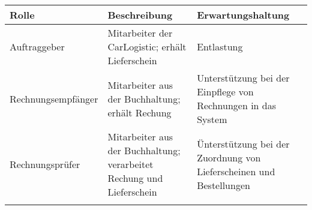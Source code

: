 \begin{table}[bh]
\centering
\caption{Stakeholder}
\label{tab:Stakeholder}
\begin{longtable}[]{@{}lll@{}}
\toprule
\begin{minipage}[b]{0.19\columnwidth}\raggedright\strut
Rolle\strut
\end{minipage} & \begin{minipage}[b]{0.27\columnwidth}\raggedright\strut
Beschreibung\strut
\end{minipage} & \begin{minipage}[b]{0.46\columnwidth}\raggedright\strut
Erwartungshaltung\strut
\end{minipage}\tabularnewline
\midrule
\endhead
\begin{minipage}[t]{0.19\columnwidth}\raggedright\strut
Auftraggeber\strut
\end{minipage} & \begin{minipage}[t]{0.27\columnwidth}\raggedright\strut
Mitarbeiter der CarLogistic; erhält Lieferschein\strut
\end{minipage} & \begin{minipage}[t]{0.46\columnwidth}\raggedright\strut
Entlastung\strut
\end{minipage}\tabularnewline
\begin{minipage}[t]{0.19\columnwidth}\raggedright\strut
Rechnungsempfänger\strut
\end{minipage} & \begin{minipage}[t]{0.27\columnwidth}\raggedright\strut
Mitarbeiter aus der Buchhaltung; erhält Rechung\strut
\end{minipage} & \begin{minipage}[t]{0.46\columnwidth}\raggedright\strut
Unterstützung bei der Einpflege von Rechnungen in das System\strut
\end{minipage}\tabularnewline
\begin{minipage}[t]{0.19\columnwidth}\raggedright\strut
Rechnungsprüfer\strut
\end{minipage} & \begin{minipage}[t]{0.27\columnwidth}\raggedright\strut
Mitarbeiter aus der Buchhaltung; verarbeitet Rechung und Lieferschein\strut
\end{minipage} & \begin{minipage}[t]{0.46\columnwidth}\raggedright\strut
Ünterstützung bei der Zuordnung von Lieferscheinen und Bestellungen\strut
\end{minipage}\tabularnewline
\begin{minipage}[t]{0.19\columnwidth}\raggedright\strut

\end{minipage}
\end{longtable}
\end{table}
